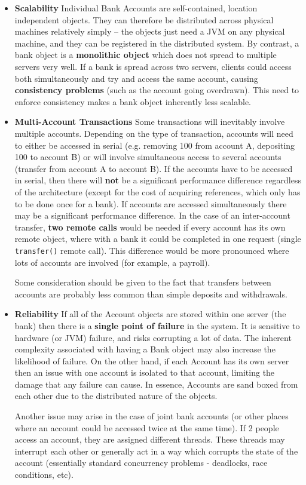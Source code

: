 \documentclass{article}
\begin{document}
\begin{itemize}
    \item \textbf{Scalability}
    Individual Bank Accounts are self-contained, location independent objects. They can therefore be distributed across physical machines relatively simply -- the objects just need a JVM on any physical machine, and they can be registered in the distributed system. By contrast, a bank object is a \textbf{monolithic object} which does not spread to multiple servers very well. If a bank is spread across two servers, clients could access both simultaneously and try and access the same account, causing \textbf{consistency problems} (such as the account going overdrawn). This need to enforce consistency makes a bank object inherently less scalable. 

    \item \textbf{Multi-Account Transactions}
    Some transactions will inevitably involve multiple accounts. Depending on the type of transaction, accounts will need to either be accessed in serial (e.g. removing 100 from account A, depositing 100 to account B) or will involve simultaneous access to several accounts (transfer from account A to account B). If the accounts have to be accessed in serial, then there will \textbf{not} be a significant performance difference regardless of the architecture (except for the cost of acquiring references, which only has to be done once for a bank). If accounts are accessed simultaneously there may be a significant performance difference. In the case of an inter-account transfer, \textbf{two remote calls} would be needed if every account has its own remote object, where with a bank it could be completed in one request (single \texttt{transfer()} remote call). This difference would be more pronounced where lots of accounts are involved (for example, a payroll). 

    Some consideration should be given to the fact that transfers between accounts are probably less common than simple deposits and withdrawals.

    \item \textbf{Reliability}
    If all of the Account objects are stored within one server (the bank) then there is a \textbf{single point of failure} in the system. It is sensitive to hardware (or JVM) failure, and risks corrupting a lot of data. The inherent complexity associated with having a Bank object may also increase the likelihood of failure. On the other hand, if each Account has its own server then an issue with one account is isolated to that account, limiting the damage that any failure can cause. In essence, Accounts are sand boxed from each other due to the distributed nature of the objects.

    Another issue may arise in the case of joint bank accounts (or other places where an account could be accessed twice at the same time). If 2 people access an account, they are assigned different threads. These threads may interrupt each other or generally act in a way which corrupts the state of the account (essentially standard concurrency problems - deadlocks, race conditions, etc).
\end{itemize}
\end{document}
